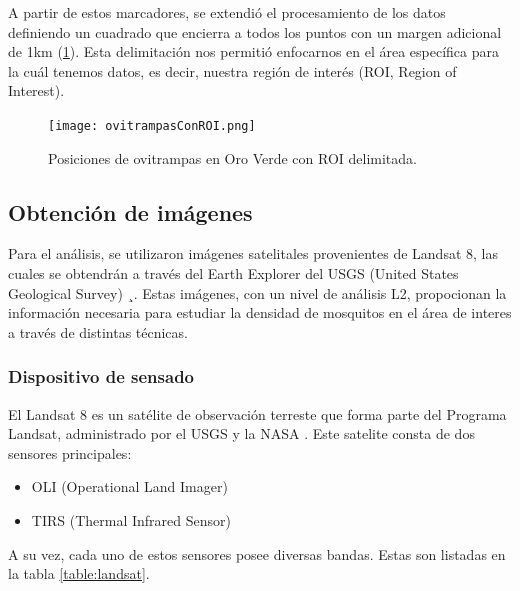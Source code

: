 A partir de estos marcadores, se extendió el procesamiento de los datos definiendo un cuadrado que encierra a todos los puntos con un margen adicional de 1km (\figurename \ref{fig:ovitrampas-ROI}). Esta delimitación nos permitió enfocarnos en el área específica para la cuál tenemos datos, es decir, nuestra región de interés (ROI, Region of Interest).

\begin{figure}[H]
	\texttt{[image: ovitrampasConROI.png]}
	\centering
	\caption{Posiciones de ovitrampas en Oro Verde con ROI delimitada.}
	\label{fig:ovitrampas-ROI}
	
\end{figure}



\subsection{Obtención de imágenes}

Para el análisis, se utilizaron imágenes satelitales provenientes de Landsat 8, las cuales se obtendrán a través del Earth Explorer del USGS (United States Geological Survey) \parencite{noauthor_earthexplorer_nodate}¸. Estas imágenes, con un nivel de análisis L2, propocionan la información necesaria para estudiar la densidad de mosquitos en el área de interes a través de distintas técnicas.

\subsubsection{Dispositivo de sensado}

El Landsat 8 es un satélite de observación terreste que forma parte del Programa Landsat, administrado por el USGS y la NASA \parencite{noauthor_landsat_2021}. Este satelite consta de dos sensores principales:
\begin{itemize}
	\item OLI (Operational Land Imager)
	\item TIRS (Thermal Infrared Sensor)
\end{itemize}

A su vez, cada uno de estos sensores posee diversas bandas. Estas son listadas en la tabla \ref{table:landsat}.
\onehalfspacing

